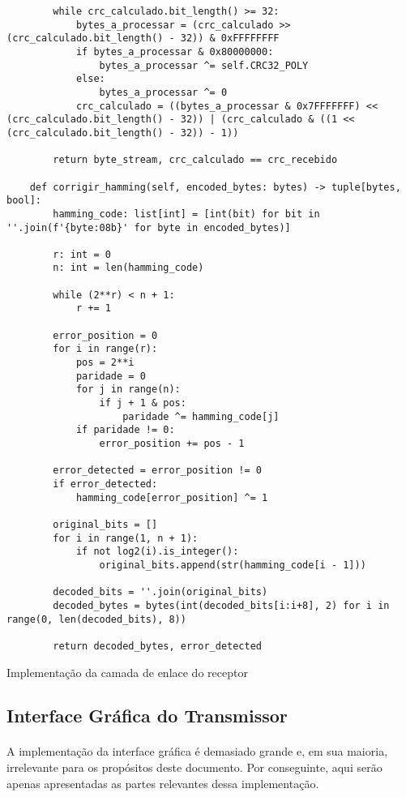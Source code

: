 \documentclass[12pt, a4paper]{article}
\newenvironment{code}{\captionsetup{type=listing}}{}
\begin{document}
\begin{code}
\begin{verbatim}
        while crc_calculado.bit_length() >= 32:
            bytes_a_processar = (crc_calculado >> (crc_calculado.bit_length() - 32)) & 0xFFFFFFFF  
            if bytes_a_processar & 0x80000000:
                bytes_a_processar ^= self.CRC32_POLY
            else:
                bytes_a_processar ^= 0
            crc_calculado = ((bytes_a_processar & 0x7FFFFFFF) << (crc_calculado.bit_length() - 32)) | (crc_calculado & ((1 << (crc_calculado.bit_length() - 32)) - 1))

        return byte_stream, crc_calculado == crc_recebido

    def corrigir_hamming(self, encoded_bytes: bytes) -> tuple[bytes, bool]:
        hamming_code: list[int] = [int(bit) for bit in ''.join(f'{byte:08b}' for byte in encoded_bytes)]
        
        r: int = 0
        n: int = len(hamming_code)
        
        while (2**r) < n + 1:
            r += 1
        
        error_position = 0
        for i in range(r):
            pos = 2**i
            paridade = 0
            for j in range(n):
                if j + 1 & pos:
                    paridade ^= hamming_code[j]
            if paridade != 0:
                error_position += pos - 1
        
        error_detected = error_position != 0
        if error_detected:
            hamming_code[error_position] ^= 1
        
        original_bits = []
        for i in range(1, n + 1):
            if not log2(i).is_integer():
                original_bits.append(str(hamming_code[i - 1]))
        
        decoded_bits = ''.join(original_bits)
        decoded_bytes = bytes(int(decoded_bits[i:i+8], 2) for i in range(0, len(decoded_bits), 8))
        
        return decoded_bytes, error_detected
\end{verbatim}
\caption{Implementação da camada de enlace do receptor}
\end{code}

\subsection{Interface Gráfica do Transmissor}
\paragraph{}
A implementação da interface gráfica é demasiado grande e, em sua maioria, irrelevante para os propósitos deste documento. Por conseguinte, aqui serão apenas apresentadas as partes relevantes dessa implementação.
\end{document}
